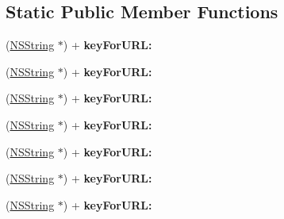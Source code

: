 \subsection*{\-Static \-Public \-Member \-Functions}
\begin{DoxyCompactItemize}
\item 
\hypertarget{interface_a_s_i_download_cache_07_08_ac8ef88dda7459ccd227e388c126d8f3b}{
(\hyperlink{class_n_s_string}{\-N\-S\-String} $\ast$) + {\bfseries key\-For\-U\-R\-L\-:}}
\label{interface_a_s_i_download_cache_07_08_ac8ef88dda7459ccd227e388c126d8f3b}

\item 
\hypertarget{interface_a_s_i_download_cache_07_08_ac8ef88dda7459ccd227e388c126d8f3b}{
(\hyperlink{class_n_s_string}{\-N\-S\-String} $\ast$) + {\bfseries key\-For\-U\-R\-L\-:}}
\label{interface_a_s_i_download_cache_07_08_ac8ef88dda7459ccd227e388c126d8f3b}

\item 
\hypertarget{interface_a_s_i_download_cache_07_08_ac8ef88dda7459ccd227e388c126d8f3b}{
(\hyperlink{class_n_s_string}{\-N\-S\-String} $\ast$) + {\bfseries key\-For\-U\-R\-L\-:}}
\label{interface_a_s_i_download_cache_07_08_ac8ef88dda7459ccd227e388c126d8f3b}

\item 
\hypertarget{interface_a_s_i_download_cache_07_08_ac8ef88dda7459ccd227e388c126d8f3b}{
(\hyperlink{class_n_s_string}{\-N\-S\-String} $\ast$) + {\bfseries key\-For\-U\-R\-L\-:}}
\label{interface_a_s_i_download_cache_07_08_ac8ef88dda7459ccd227e388c126d8f3b}

\item 
\hypertarget{interface_a_s_i_download_cache_07_08_ac8ef88dda7459ccd227e388c126d8f3b}{
(\hyperlink{class_n_s_string}{\-N\-S\-String} $\ast$) + {\bfseries key\-For\-U\-R\-L\-:}}
\label{interface_a_s_i_download_cache_07_08_ac8ef88dda7459ccd227e388c126d8f3b}

\item 
\hypertarget{interface_a_s_i_download_cache_07_08_ac8ef88dda7459ccd227e388c126d8f3b}{
(\hyperlink{class_n_s_string}{\-N\-S\-String} $\ast$) + {\bfseries key\-For\-U\-R\-L\-:}}
\label{interface_a_s_i_download_cache_07_08_ac8ef88dda7459ccd227e388c126d8f3b}

\item 
\hypertarget{interface_a_s_i_download_cache_07_08_ac8ef88dda7459ccd227e388c126d8f3b}{
(\hyperlink{class_n_s_string}{\-N\-S\-String} $\ast$) + {\bfseries key\-For\-U\-R\-L\-:}}
\label{interface_a_s_i_download_cache_07_08_ac8ef88dda7459ccd227e388c126d8f3b}


\end{DoxyCompactItemize}
